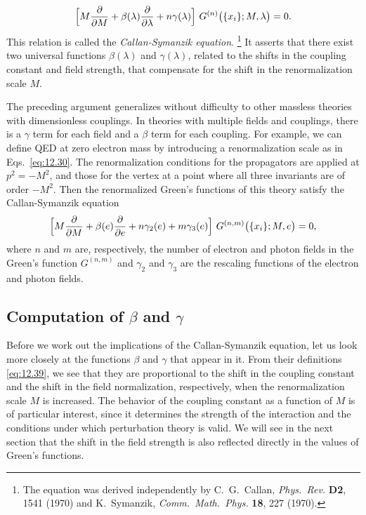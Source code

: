 \begin{equation}
  \Bigl[ M\frac{\partial}{\partial M} + \beta(\lambda)\frac{\partial}
    {\partial\lambda} + n\gamma(\lambda) \Bigr]\ G^{(n)}\bigl( \{x_i\}; M,
      \lambda \bigr) = 0 .
  \label{eq:12.41}
\end{equation}
This relation is called the \emph{Callan-Symanzik equation}.%
\footnote{The equation was derived independently by C.~G.~Callan,
\emph{Phys.\ Rev.} \textbf{D2}, 1541 (1970) and K.~Symanzik,
\emph{Comm.\ Math.\ Phys.} \textbf{18}, 227 (1970).}  It asserts that there
exist two universal functions $\beta(\lambda)$ and $\gamma(\lambda)$, related
to the shifts in the coupling constant and field strength, that compensate
for the shift in the renormalization scale $M$.

The preceding argument generalizes without difficulty to other massless
theories with dimensionless couplings.  In theories with multiple fields and
couplings, there is a $\gamma$ term for each field and a $\beta$ term for
each coupling.  For example, we can define QED at zero electron mass by
introducing a renormalization scale as in Eqs.~\eqref{eq:12.30}.  The
renormalization conditions for the propagators are applied at $p^2 = -M^2$,
and those for the vertex at a point where all three invariants are of order
$-M^2$.  Then the renormalized Green's functions of this theory satisfy the
Callan-Symanzik equation
\begin{equation}
  \Bigl[ M\frac{\partial}{\partial M} + \beta(e)\frac{\partial}{\partial e}
    + n\gamma_2(e) + m\gamma_3(e) \Bigr]\ G^{(n,m)}\bigl( \{x_i\}; M, e \bigr)
  = 0 ,
  \label{eq:12.42}
\end{equation}
where $n$ and $m$ are, respectively, the number of electron and photon fields
in the Green's function $G^{(n,m)}$ and $\gamma_2$ and $\gamma_3$ are the
rescaling functions of the electron and photon fields.

\subsection{Computation of $\beta$ and $\gamma$}

Before we work out the implications of the Callan-Symanzik equation, let us
look more closely at the functions $\beta$ and $\gamma$ that appear in it.
From their definitions \eqref{eq:12.39}, we see that they are proportional to
the shift in the coupling constant and the shift in the field normalization,
respectively, when the renormalization scale $M$ is increased.  The behavior
of the coupling constant as a function of $M$ is of particular interest,
since it determines the strength of the interaction and the conditions under
which perturbation theory is valid.  We will see in the next section that the
shift in the field strength is also reflected directly in the values of
Green's functions.

